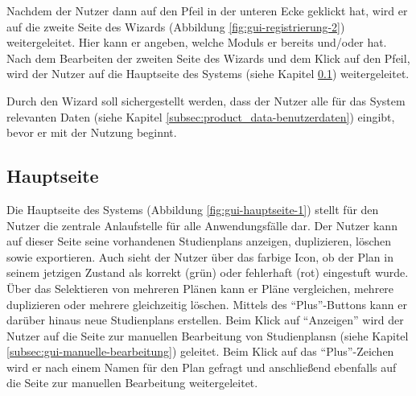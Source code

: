 Nachdem der Nutzer dann auf den Pfeil in der unteren Ecke geklickt hat, wird er auf die zweite Seite des \gls{Wizard}s (Abbildung \ref{fig:gui-registrierung-2}) weitergeleitet. Hier kann er angeben, welche \glspl{Modul} er bereits  und/oder  hat. 
Nach dem Bearbeiten der zweiten Seite des \gls{Wizard}s und dem Klick auf den Pfeil, wird der Nutzer auf die Hauptseite des Systems (siehe Kapitel \ref{subsec:gui-hauptseite}) weitergeleitet.

Durch den \gls{Wizard} soll sichergestellt werden, dass der Nutzer alle für das System relevanten Daten (siehe Kapitel \ref{subsec:product_data-benutzerdaten}) eingibt, bevor er mit der Nutzung beginnt.


\subsection{Hauptseite}
\label{subsec:gui-hauptseite}
Die Hauptseite des Systems (Abbildung \ref{fig:gui-hauptseite-1}) stellt für den Nutzer die zentrale Anlaufstelle für alle Anwendungsfälle dar. Der Nutzer kann auf dieser Seite seine vorhandenen \glspl{Studienplan} anzeigen, duplizieren, löschen sowie exportieren. Auch sieht der Nutzer über das farbige Icon, ob der Plan in seinem jetzigen Zustand als korrekt (grün) oder fehlerhaft (rot) eingestuft wurde. Über das Selektieren von mehreren Plänen kann er Pläne vergleichen, mehrere duplizieren oder mehrere gleichzeitig löschen. Mittels des \enquote{Plus}-Buttons kann er darüber hinaus neue \glspl{Studienplan} erstellen.\newline
Beim Klick auf \enquote{Anzeigen} wird der Nutzer auf die Seite zur manuellen Bearbeitung von \glspl{Studienplan}n (siehe Kapitel \ref{subsec:gui-manuelle-bearbeitung}) geleitet. Beim Klick auf das \enquote{Plus}-Zeichen wird er nach einem Namen für den Plan gefragt und anschließend ebenfalls auf die Seite zur manuellen Bearbeitung weitergeleitet.



